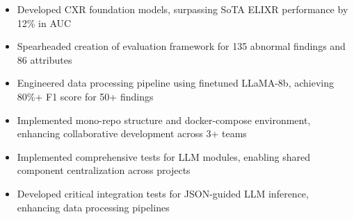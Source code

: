 \begin{cventries}
{\begin{cvitems}
      \begin{itemize}
        \item Developed CXR foundation models, surpassing SoTA ELIXR performance by 12\% in AUC
        \item Spearheaded creation of evaluation framework for 135 abnormal findings and 86 attributes
        \item Engineered data processing pipeline using finetuned LLaMA-8b, achieving 80\%+ F1 score for 50+ findings
        \item Implemented mono-repo structure and docker-compose environment, enhancing collaborative development across 3+ teams
        \item Implemented comprehensive tests for LLM modules, enabling shared component centralization across projects
        \item Developed critical integration tests for JSON-guided LLM inference, enhancing data processing pipelines
      \end{itemize}
    \end{cvitems}
  }

\end{cventries}
\vspace{2mm}